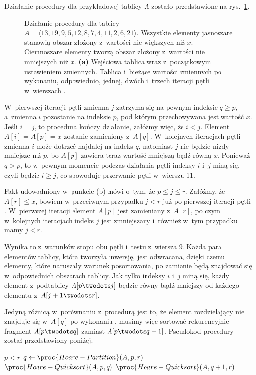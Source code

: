 
\subproblem %
Działanie procedury  dla przykładowej tablicy $A$ zostało przedstawione na rys.\ \ref{fig:7-1a}.
\begin{figure}[!ht]
	\centering 
	\caption{Działanie procedury  dla tablicy $A=\langle13,19,9,5,12,8,7,4,11,2,6,21\rangle$.
Wszystkie elementy jasnoszare stanowią obszar złożony z~wartości nie większych niż $x$.
Ciemnoszare elementy tworzą obszar złożony z~wartości nie mniejszych niż $x$.
{\sffamily\bfseries(a)} Wejściowa tablica wraz z~początkowym ustawieniem zmiennych.
{\sffamily\bfseries{}} Tablica i~bieżące wartości zmiennych po wykonaniu, odpowiednio, jednej, dwóch i~trzech iteracji pętli  w~wierszach .} \label{fig:7-1a}
\end{figure}

\subproblem %
W~pierwszej iteracji pętli  zmienna $j$ zatrzyma się na pewnym indeksie $q\ge p$, a~zmienna $i$ pozostanie na indeksie $p$, pod którym przechowywana jest wartość $x$.
Jeśli $i=j$, to procedura kończy działanie, załóżmy więc, że $i<j$.
Element $A[i]=A[p]=x$ zostanie zamieniony z~$A[q]$.
W~kolejnych iteracjach pętli  zmienna $i$ może dotrzeć najdalej na indeks $q$, natomiast $j$ nie będzie nigdy mniejsze niż $p$, bo $A[p]$ zawiera teraz wartość mniejszą bądź równą $x$.
Ponieważ $q>p$, to w~pewnym momencie podczas działania pętli indeksy $i$ i~$j$ miną się, czyli będzie $i\ge j$, co spowoduje przerwanie pętli w~wierszu 11.

\subproblem %

\noindent Fakt udowodniony w~punkcie (b) mówi o~tym, że $p\le j\le r$.
Załóżmy, że $A[r]\le x$, bowiem w~przeciwnym przypadku $j<r$ już po pierwszej iteracji pętli .
W~pierwszej iteracji element $A[p]$ jest zamieniany z~$A[r]$, po czym w~kolejnych iteracjach indeks $j$ jest zmniejszany i~również w~tym przypadku mamy $j<r$.

\subproblem %
Wynika to z~warunków stopu obu pętli  i~testu z~wiersza 9.
Każda para elementów tablicy, która tworzyła inwersję, jest odwracana, dzięki czemu elementy, które naruszały warunek posortowania, po zamianie będą znajdować się w~odpowiednich obszarach tablicy.
Jak tylko indeksy $i$ i~$j$ miną się, każdy element z~podtablicy $A[p\twodots j]$ będzie równy bądź mniejszy od każdego elementu z~$A[j+1\twodots r]$.

\subproblem %
Jedyną różnicą w~porównaniu z~procedurą  jest to, że element rozdzielający nie znajduje się w~$A[q]$ po wykonaniu , musimy więc sortować rekurencyjnie fragment $A[p\twodots q]$ zamiast $A[p\twodots q-1]$.
Pseudokod procedury został przedstawiony poniżej.
\begin{codebox}
\li	\If $p<r$
\li		\Then $q\gets\proc{Hoare-Partition}(A,p,r)$
\li			$\proc{Hoare-Quicksort}(A,p,q)$
\li			$\proc{Hoare-Quicksort}(A,q+1,r)$
		\End
\end{codebox}
